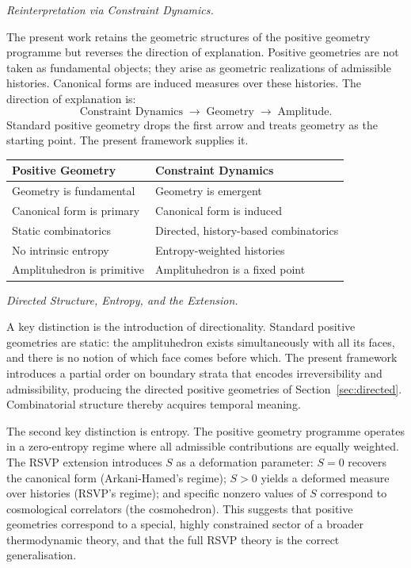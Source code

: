 \documentclass[12pt, oneside]{amsart}
\theoremstyle{plain}
\theoremstyle{definition}
\theoremstyle{remark}
\newcommand{\Sf}{S}
\begin{document}
\medskip\noindent\textit{Reinterpretation via Constraint Dynamics.}

The present work retains the geometric structures of the positive geometry programme but reverses the direction of explanation. Positive geometries are not taken as fundamental objects; they arise as geometric realizations of admissible histories. Canonical forms are induced measures over these histories. The direction of explanation is:
\[
  \text{Constraint Dynamics} \;\longrightarrow\; \text{Geometry} \;\longrightarrow\; \text{Amplitude}.
\]
Standard positive geometry drops the first arrow and treats geometry as the starting point. The present framework supplies it.

\begin{center}
\begin{tabular}{ll}
\toprule
Positive Geometry & Constraint Dynamics \\
\midrule
Geometry is fundamental & Geometry is emergent \\
Canonical form is primary & Canonical form is induced \\
Static combinatorics & Directed, history-based combinatorics \\
No intrinsic entropy & Entropy-weighted histories \\
Amplituhedron is primitive & Amplituhedron is a fixed point \\
\bottomrule
\end{tabular}
\end{center}

\medskip\noindent\textit{Directed Structure, Entropy, and the Extension.}

A key distinction is the introduction of directionality. Standard positive geometries are static: the amplituhedron exists simultaneously with all its faces, and there is no notion of which face comes before which. The present framework introduces a partial order on boundary strata that encodes irreversibility and admissibility, producing the directed positive geometries of Section~\ref{sec:directed}. Combinatorial structure thereby acquires temporal meaning.

The second key distinction is entropy. The positive geometry programme operates in a zero-entropy regime where all admissible contributions are equally weighted. The RSVP extension introduces $\Sf$ as a deformation parameter: $\Sf = 0$ recovers the canonical form (Arkani-Hamed's regime); $\Sf > 0$ yields a deformed measure over histories (RSVP's regime); and specific nonzero values of $\Sf$ correspond to cosmological correlators (the cosmohedron). This suggests that positive geometries correspond to a special, highly constrained sector of a broader thermodynamic theory, and that the full RSVP theory is the correct generalisation.
\end{document}
